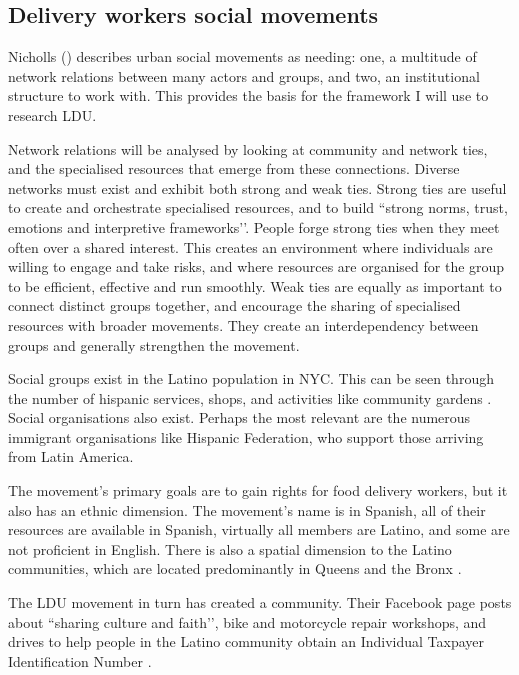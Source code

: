 \documentclass{article}
\begin{document}
\subsection{Delivery workers social movements}

Nicholls (\citeyear{nicholls2008urban}) describes urban social movements as needing: one, a multitude of network relations between many actors and groups, and two, an institutional structure to work with.
This provides the basis for the framework I will use to research LDU. 

Network relations will be analysed by looking at community and network ties, and the specialised resources that emerge from these connections.
Diverse networks must exist and exhibit both strong and weak ties. Strong ties are useful to create and orchestrate specialised resources, and to build ``strong norms, trust, emotions and interpretive frameworks’’\parencite{nicholls2008urban}. People forge strong ties when they meet often over a shared interest. This creates an environment where individuals are willing to engage and take risks, and where resources are organised for the group to be efficient, effective and run smoothly. 
Weak ties are equally as important to connect distinct groups together, and encourage the sharing of specialised resources with broader movements. They create an interdependency between groups and generally strengthen the movement.

Social groups exist in the Latino population in NYC. This can be seen through the number of hispanic services, shops, and activities like community gardens \parencite{saldivar2004culturing}. Social organisations also exist. Perhaps the most relevant are the numerous immigrant organisations like Hispanic Federation, who support those arriving from Latin America. 

The movement’s primary goals are to gain rights for food delivery workers, but it also has an ethnic dimension. The movement’s name is in Spanish, all of their resources are available in Spanish, virtually all members are Latino, and some are not proficient in English. There is also a spatial dimension to the Latino communities, which are located predominantly in Queens and the Bronx \parencite{nycimmigrantpopulation2021}. 

The LDU movement in turn has created a community. Their Facebook page posts about ``sharing culture and faith’’, bike and motorcycle repair workshops, and drives to help people in the Latino community obtain an Individual Taxpayer Identification Number \parencite{facebookldu}.
\end{document}
